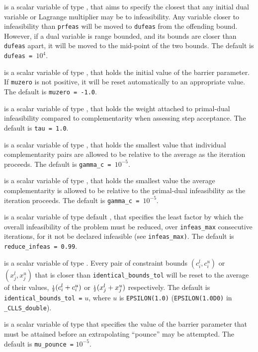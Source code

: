\documentclass{galahad}
\newcommand{\packagename}{CLLS}
\newcommand{\fullpackagename}{\libraryname\_\packagename}
\begin{document}
\begin{description}
 is a scalar variable of type \realdp, that aims to specify
the closest that any initial dual variable or Lagrange multiplier may be to
infeasibility. Any variable closer to infeasibility than {\tt prfeas} will be
moved to {\tt dufeas} from the offending bound. However, if a dual variable
is range bounded, and its bounds are closer than {\tt dufeas} apart, it will
be moved to the mid-point of the two bounds.
The default is {\tt dufeas = $10^4$}.

  is a scalar variable of type \realdp, that holds the
initial value of the barrier parameter. If {\tt muzero} is
not positive, it will be reset automatically to an appropriate value.
The default is {\tt muzero = -1.0}.

  is a scalar variable of type \realdp, that holds the
weight attached to primal-dual infeasibility compared to complementarity
when assessing step acceptance.
The default is {\tt tau = 1.0}.

  is a scalar variable of type \realdp, that holds the
smallest value that individual complementarity pairs are allowed
to be relative to the average as the iteration proceeds.
The default is {\tt gamma\_c = $10^{-5}$}.

  is a scalar variable of type \realdp, that holds the
smallest value the average complementarity is allowed
to be relative to the primal-dual infeasibility as the iteration proceeds.
The default is {\tt gamma\_c = $10^{-5}$}.

  is a scalar variable of type default
\realdp, that specifies the
least factor by which the overall infeasibility of the problem must be reduced,
over {\tt infeas\_max} consecutive iterations,
for it not be declared infeasible (see {\tt infeas\_max)}.
The default is {\tt reduce\_infeas = 0.99}.

is a scalar variable of type \realdp.
Every pair of constraint bounds
$(c_{i}^{l}, c_{i}^{u})$ or $(x_{j}^{l}, x_{j}^{u})$
that is closer than {\tt identical\_bounds\_tol}
will be reset to the average of their values,
${\scriptstyle \frac{1}{2}} (c_{i}^{l} + c_{i}^{u})$ or ${\scriptstyle \frac{1}{2}} (x_{j}^{l} + x_{j}^{u})$
respectively.
The default is {\tt identical\_bounds\_tol =} $u$,
where $u$ is {\tt EPSILON(1.0)} ({\tt EPSILON(1.0D0)} in
{\tt \fullpackagename\_double}).

is a scalar variable of type \realdp that specifies
the value of the barrier parameter that must be attained before an 
extrapolating ``pounce'' may be attempted.
The default is {\tt mu\_pounce =} $10^{-5}$.


\end{description}
\end{document}
